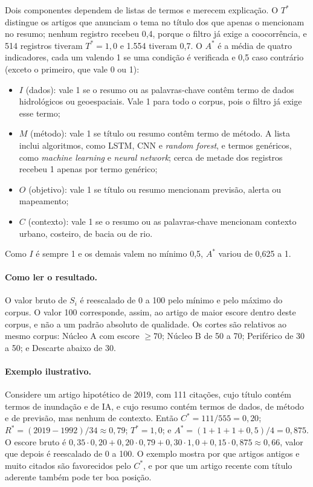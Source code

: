 Dois componentes dependem de listas de termos e merecem explicação. O $T^{*}$ distingue os artigos que anunciam o tema no título dos que apenas o mencionam no resumo; nenhum registro recebeu 0,4, porque o filtro já exige a coocorrência, e 514 registros tiveram $T^{*}=1{,}0$ e 1.554 tiveram 0,7. O $A^{*}$ é a média de quatro indicadores, cada um valendo 1 se uma condição é verificada e 0,5 caso contrário (exceto o primeiro, que vale 0 ou 1):
%
\begin{itemize}
  \item $I$ (dados): vale 1 se o resumo ou as palavras-chave contêm termo de dados hidrológicos ou geoespaciais. Vale 1 para todo o corpus, pois o filtro já exige esse termo;
  \item $M$ (método): vale 1 se título ou resumo contêm termo de método. A lista inclui algoritmos, como LSTM, CNN e \textit{random forest}, e termos genéricos, como \textit{machine learning} e \textit{neural network}; cerca de metade dos registros recebeu 1 apenas por termo genérico;
  \item $O$ (objetivo): vale 1 se título ou resumo mencionam previsão, alerta ou mapeamento;
  \item $C$ (contexto): vale 1 se o resumo ou as palavras-chave mencionam contexto urbano, costeiro, de bacia ou de rio.
\end{itemize}
%
Como $I$ é sempre 1 e os demais valem no mínimo 0,5, $A^{*}$ variou de 0,625 a 1.

\paragraph{Como ler o resultado.} O valor bruto de $S_i$ é reescalado de 0 a 100 pelo mínimo e pelo máximo do corpus. O valor 100 corresponde, assim, ao artigo de maior escore dentro deste corpus, e não a um padrão absoluto de qualidade. Os cortes são relativos ao mesmo corpus: Núcleo A com escore $\geq 70$; Núcleo B de 50 a 70; Periférico de 30 a 50; e Descarte abaixo de 30.

\paragraph{Exemplo ilustrativo.} Considere um artigo hipotético de 2019, com 111 citações, cujo título contém termos de inundação e de IA, e cujo resumo contém termos de dados, de método e de previsão, mas nenhum de contexto. Então $C^{*}=111/555=0{,}20$; $R^{*}=(2019-1992)/34\approx 0{,}79$; $T^{*}=1{,}0$; e $A^{*}=(1+1+1+0{,}5)/4=0{,}875$. O escore bruto é $0{,}35\cdot 0{,}20+0{,}20\cdot 0{,}79+0{,}30\cdot 1{,}0+0{,}15\cdot 0{,}875\approx 0{,}66$, valor que depois é reescalado de 0 a 100. O exemplo mostra por que artigos antigos e muito citados são favorecidos pelo $C^{*}$, e por que um artigo recente com título aderente também pode ter boa posição.

